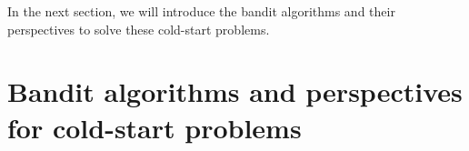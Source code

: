 \documentclass[twoside,leqno,twocolumn]{article}
\newtheorem{mydef}{Definition}
\newcommand{\jm}[1]{{\color{TealBlue}(jm) #1\color{black}}}
\newcommand{\hai}[1]{\color{blue}(hai) #1\color{black}}
\begin{document}
%
%

In the next section, we will introduce the bandit algorithms and their perspectives to solve these cold-start problems.

\section{Bandit algorithms and perspectives for cold-start problems}
\label{MAB}
\end{document}
